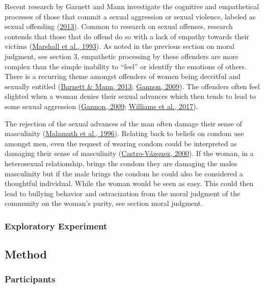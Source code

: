 \documentclass[
  donotrepeattitle,doc, 12pt, a4paper,floatsintext]{apa7}
\begin{document}
Recent research by Garnett and Mann investigate the cognitive and empathetical processes of those that commit a sexual aggression or sexual violence, labeled as sexual offending (\protect\hyperlink{ref-barnett2013}{2013}). Common to research on sexual offenses, research contends that those that do offend do so with a lack of empathy towards their victims (\protect\hyperlink{ref-marshall1993}{Marshall et al., 1993}). As noted in the previous section on moral judgment, see section 3, empathetic processing by these offenders are more complex than the simple inability to ``feel'' or identify the emotions of others. There is a recurring theme amongst offenders of women being deceitful and sexually entitled (\protect\hyperlink{ref-barnett2013}{Barnett \& Mann, 2013}; \protect\hyperlink{ref-gannon2009}{Gannon, 2009}). The offenders often feel slighted when a woman denies their sexual advances which then tends to lead to some sexual aggression (\protect\hyperlink{ref-gannon2009}{Gannon, 2009}; \protect\hyperlink{ref-williams2017}{Williams et al., 2017}).

The rejection of the sexual advances of the man often damage their sense of masculinity (\protect\hyperlink{ref-malamuth1996}{Malamuth et al., 1996}). Relating back to beliefs on condom use amongst men, even the request of wearing condom could be interpreted as damaging their sense of masculinity (\protect\hyperlink{ref-castrovazquez2000}{Castro-Vázquez, 2000}). If the woman, in a heterosexual relationship, brings the condom they are damaging the males masculinity but if the male brings the condom he could also be considered a thoughtful individual. While the woman would be seen as easy. This could then lead to bullying behavior and ostracization from the moral judgment of the community on the woman's purity, see section moral judgment.

\hypertarget{exploratory-experiment}{%
\subsubsection{Exploratory Experiment}\label{exploratory-experiment}}

\hypertarget{method}{%
\subsection{Method}\label{method}}

\hypertarget{participants}{%
\subsubsection{Participants}\label{participants}}
\end{document}
